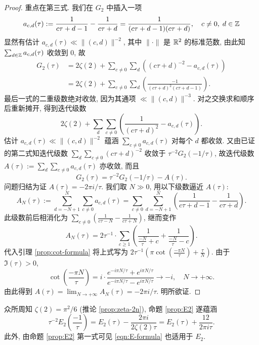 \begin{proof}
	重点在第三式. 我们在 $G_2$ 中插入一项
	\[ a_{c,d}(\tau) := \frac{1}{c\tau + d - 1} - \frac{1}{c\tau + d} = \frac{1}{(c\tau + d - 1)(c\tau + d)}, \quad c \neq 0, \; d \in \mathbb{Z} \]
	显然有估计 $a_{c,d}(\tau) \ll \|(c,d) \|^{-2}$, 其中 $\|\cdot\|$ 是 $\mathbb{R}^2$ 的标准范数, 由此知 $\sum_{d \in \mathbb{Z}} a_{c,d}(\tau)$ 收敛到 $0$, 故
	\begin{align*}
		G_2(\tau) &= 2\zeta(2) + \sum_{c \neq 0} \sum_d \left( (c\tau+d)^{-2} - a_{c,d}(\tau) \right) \\
		& = 2\zeta(2) + \sum_{c \neq 0} \sum_d \left( \frac{-1}{ (c\tau + d)^2 (c\tau + d - 1) } \right).
	\end{align*}
	最后一式的二重级数绝对收敛, 因为其通项 $\ll \|(c,d)\|^{-3}$. 对之交换求和顺序后重新摊开, 得到迭代级数
	\[ 2\zeta(2) + \sum_d \sum_{c \neq 0} \left( \frac{1}{(c\tau + d)^2} - a_{c,d}(\tau) \right). \]
	估计 $a_{c,d}(\tau) \ll \|(c,d)\|^{-2}$ 蕴涵 $\sum_{c \neq 0} a_{c,d}(\tau)$ 对每个 $d$ 都收敛. 又由已证的第二式知迭代级数 $\sum_d \sum_{c \neq 0} (c\tau + d)^{-2}$ 收敛于 $\tau^{-2} G_2(-1/\tau)$, 故迭代级数 $A(\tau) := \sum_d \sum_{c \neq 0} a_{c,d}(\tau)$ 亦收敛, 而且
	\[ G_2(\tau) = \tau^{-2} G_2(-1/\tau) - A(\tau). \]
	问题归结为证 $A(\tau) = -2\pi i/\tau$. 我们取 $N \gg 0$, 用以下级数逼近 $A(\tau)$:
	\[ A_N(\tau) := \sum_{d=-N+1}^N \sum_{c \neq 0} a_{c,d}(\tau) = \sum_{c \neq 0} \sum_{d=-N+1}^N \left( \frac{1}{c\tau + d - 1} - \frac{1}{c\tau + d} \right). \]
	此级数前后相消化为 $\sum_{c \neq 0} \left( \frac{1}{c\tau - N} - \frac{1}{c\tau + N} \right)$, 继而变作
	\begin{equation*}
		A_N(\tau) = 2\tau^{-1} \cdot \sum_{c \geq 1} \left(\frac{1}{\frac{-N}{\tau} + c } + \frac{1}{\frac{-N}{\tau} - c} \right).
	\end{equation*}
	代入引理 \ref{prop:cot-formula} 将上式写为 $2\tau^{-1} \left( \pi\cot \left(\frac{-\pi N}{\tau}\right) + \frac{\tau}{N} \right)$. 由于 $\Im(\tau) > 0$,
	\[ \cot\left( \frac{-\pi N}{\tau} \right) = i \cdot \frac{e^{-i\pi N/\tau} + e^{i\pi N/\tau}}{e^{-i\pi N/\tau} - e^{i\pi N/\tau} } \to -i, \quad N \to +\infty. \]
	由此得到 $A(\tau) = \lim_{N \to +\infty} A_N(\tau) = -2\pi i/\tau$. 明所欲证.
\end{proof}

众所周知 $\zeta(2) = \pi^2/6$ (推论 \ref{prop:zeta-2n}), 命题 \ref{prop:E2} 遂蕴涵
\begin{equation}\label{eqn:E2-fcneq}
	\tau^{-2} E_2\left( \frac{-1}{\tau} \right) = E_2(\tau) - \frac{2\pi i}{2\zeta(2)\tau} = E_2(\tau) + \frac{12}{2\pi i\tau}.
\end{equation}
此外, 由命题 \ref{prop:E2} 第一式可见 \eqref{eqn:E-formula} 也适用于 $E_2$.

